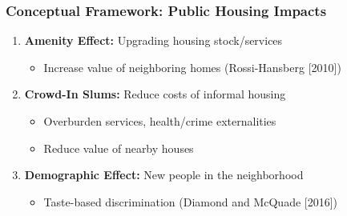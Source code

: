 \documentclass[aspectratio=149]{beamer}
\begin{document}



\begin{frame}
\frametitle{Conceptual Framework: Public Housing Impacts}

\begin{enumerate}
  \item \textbf{Amenity Effect:} Upgrading housing stock/services
    \begin{itemize}
        \item Increase value of neighboring homes (Rossi-Hansberg [2010])
    \end{itemize}
\vspace{.2cm} 

  \item \textbf{Crowd-In Slums:} Reduce costs of informal housing
    \begin{itemize}
        \item Overburden services, health/crime externalities
        \item Reduce value of nearby houses
    \end{itemize}
\vspace{.2cm}

  \item \textbf{Demographic Effect:} New people in the neighborhood
    \begin{itemize}
        \item Taste-based discrimination (Diamond and McQuade [2016])
    \end{itemize}
\end{enumerate}


\end{frame}
\end{document}
